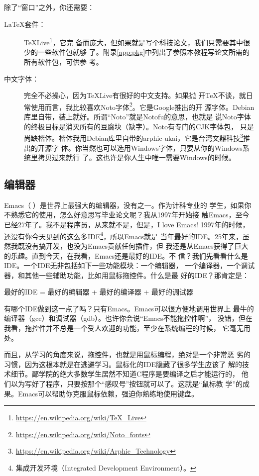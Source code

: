 除了“窗口”之外，你还需要：
\begin{description}
\item[\LaTeX{}套件：]
  TeXLive\footnote{\url{https://en.wikipedia.org/wiki/TeX_Live}}，它完
  备而庞大，但如果就是写个科技论文，我们只需要其中很少的一些软件包就够
  了。附录\ref{app:pkg}中列出了参照本教程写论文所需的所有软件包，可供参
  考。
\item[中文字体：] 完全不必操心，因为TeXLive有很好的中文支持。如果抛
  开\TeX{}不谈，就日常使用而言，我比较喜欢Noto字体\footnote{%
    \url{https://en.wikipedia.org/wiki/Noto_fonts}}。它是Google推出的开
  源字体。Debian库里自带，装上就好。所谓“Noto”就是Notofu的意思，也就是
  说Noto字体的终极目标是消灭所有的豆腐块（缺字）。Noto有专门的CJK字体包，
  只是尚缺楷体。楷体我用Debian库里自带的arphic-ukai，它是台湾文鼎科技\footnote{%
    \url{https://en.wikipedia.org/wiki/Arphic_Technology}}推出的开源字
  体。你当然也可以选用Windows字体，只要从你的Windows系统里拷贝过来就行
  了。这也许是你人生中唯一需要Windows的时候。
\end{description}

\subsection{编辑器}
\label{sec:emacs}

Emacs（）是世界上最强大的编辑器\cite{emacs}，没有之一。作为计科专业的
学生，如果你不熟悉它的使用，怎么好意思写毕业论文呢？我从1997年开始接
触Emacs，至今已经27年了。我不是程序员，从来就不是，但是，I love Emacs!
1997年的时候，还没有你今天见到的这么多IDE\footnote{%
  集成开发环境（Integrated Development Environment）。}，所以Emacs就是
当年最好的IDE。25年来，虽然我既没有搞开发，也没为Emacs贡献任何插件，但
我还是从Emacs获得了巨大的乐趣。直到今天，在我看，Emacs还是最好的IDE。不
信？我们先看看什么是IDE。一个IDE无非包括如下一些功能模块：一个编辑器，
一个编译器，一个调试器，和其他一些辅助功能，比如用鼠标拖控件。什么是最
好的IDE？那肯定是：
\begin{center}
  最好的IDE = 最好的编辑器 + 最好的编译器 + 最好的调试器
\end{center}
有哪个IDE做到这一点了吗？只有Emacs。Emacs可以很方便地调用世界上
最牛的编译器（gcc）和调试器（gdb）。也许你会说“Emacs不能拖控件啊”，
没错，但在我看，拖控件并不总是一个受人欢迎的功能，至少在系统编程的时候，
它毫无用处。

而且，从学习的角度来说，拖控件，也就是用鼠标编程，绝对是一个非常恶
劣的习惯，因为这根本就是在逃避学习。鼠标化的IDE隐藏了很多学生应该了
解的技术细节。鄙学院的绝大多数学生居然不知道C程序是要编译之后才能运行的，
他们以为写好了程序，只要按那个“感叹号”按钮就可以了。这就是“鼠标教
学”的成果。Emacs可以帮助你克服鼠标依赖，强迫你熟练地使用键盘。

